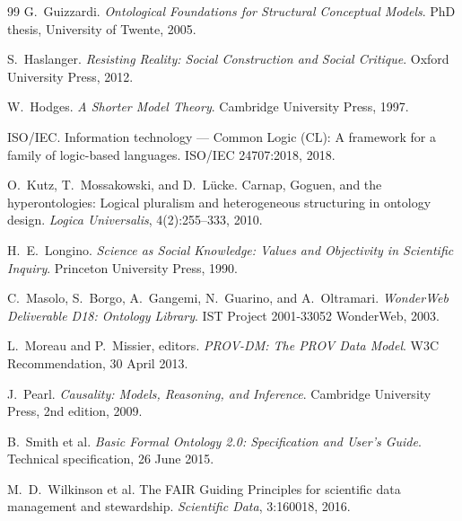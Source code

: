 \documentclass[11pt]{article}
\theoremstyle{plain}
\theoremstyle{definition}
\theoremstyle{remark}
\begin{document}
\begin{thebibliography}{99}
  G.\ Guizzardi.
  \emph{Ontological Foundations for Structural Conceptual Models}.
  PhD thesis, University of Twente, 2005.

  S.\ Haslanger.
  \emph{Resisting Reality: Social Construction and Social Critique}.
  Oxford University Press, 2012.

  W.\ Hodges.
  \emph{A Shorter Model Theory}.
  Cambridge University Press, 1997.

  ISO/IEC.
  Information technology --- Common Logic (CL): A framework for a family of logic-based languages.
  ISO/IEC 24707:2018, 2018.

  O.\ Kutz, T.\ Mossakowski, and D.\ L\"ucke.
  Carnap, Goguen, and the hyperontologies: Logical pluralism and heterogeneous structuring in ontology design.
  \emph{Logica Universalis}, 4(2):255--333, 2010.

  H.\ E.\ Longino.
  \emph{Science as Social Knowledge: Values and Objectivity in Scientific Inquiry}.
  Princeton University Press, 1990.

  C.\ Masolo, S.\ Borgo, A.\ Gangemi, N.\ Guarino, and A.\ Oltramari.
  \emph{WonderWeb Deliverable D18: Ontology Library}.
  IST Project 2001-33052 WonderWeb, 2003.

  L.\ Moreau and P.\ Missier, editors.
  \emph{PROV-DM: The PROV Data Model}.
  W3C Recommendation, 30 April 2013.

  J.\ Pearl.
  \emph{Causality: Models, Reasoning, and Inference}.
  Cambridge University Press, 2nd edition, 2009.

  B.\ Smith et al.
  \emph{Basic Formal Ontology 2.0: Specification and User's Guide}.
  Technical specification, 26 June 2015.

  M.\ D.\ Wilkinson et al.
  The FAIR Guiding Principles for scientific data management and stewardship.
  \emph{Scientific Data}, 3:160018, 2016.

\end{thebibliography}
\end{document}
